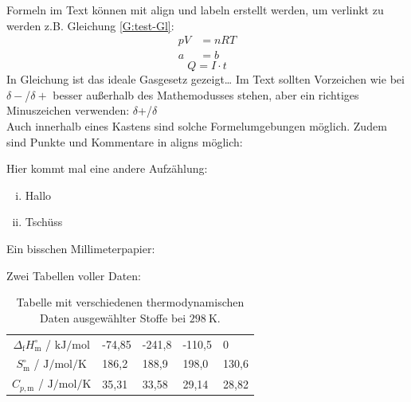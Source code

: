 \documentclass[../main.tex]{subfiles}
\begin{document}
Formeln im Text k\"onnen mit align und labeln erstellt werden, um verlinkt zu werden z.B. Gleichung \ref{G:test-Gl}:
\begin{align}
    pV &= nRT \label{G:test-Gl}\\
    a &= b
\end{align}
\begin{equation*}
    Q = I \cdot t
\end{equation*}
In Gleichung ist das ideale Gasgesetz gezeigt\ldots 
Im Text sollten Vorzeichen wie bei $\delta-$/$\delta+$ besser au\ss{}erhalb des Mathemodusses stehen, aber ein richtiges Minuszeichen verwenden: $\delta$+/$\delta$\textminus{}\\
Auch innerhalb eines Kastens sind solche Formelumgebungen m\"oglich. Zudem sind Punkte und Kommentare in aligns m\"oglich:\par
{}
Hier kommt mal eine andere Aufz\"ahlung:
\begin{enumerate}[(i)]
    \item Hallo
    \item Tsch\"uss
\end{enumerate}

Ein bisschen Millimeterpapier:\\


Zwei Tabellen voller Daten:
\begin{table}[H]
    \caption{Tabelle mit verschiedenen thermodynamischen Daten ausgew\"ahlter Stoffe bei $\SI{298}{\kelvin}$.}
    \label{tab: 2025-10-3_therm. Daten}
    \centering
    \begin{tabular}{|c|C{1.5cm}|C{1.5cm}|C{1.5cm}|C{1.5cm}|}
    \hline
        &  &  &  & \\\hline
        $\Delta_\mathrm{f}H^{\circ}_\mathrm{m}$ / $\si{\kilo\joule\per\mole}$ & -74,85 & -241,8 & -110,5 & 0\\\hline
        $S^{\circ}_\mathrm{m}$ / $\si{\joule\per\mole\per\kelvin}$ & 186,2 & 188,9 & 198,0 & 130,6\\\hline
        $C_{p, \mathrm{m}}$ / $\si{\joule\per\mole\per\kelvin}$ & 35,31 & 33,58 & 29,14 & 28,82\\\hline
    \end{tabular}
\end{table}
\end{document}
